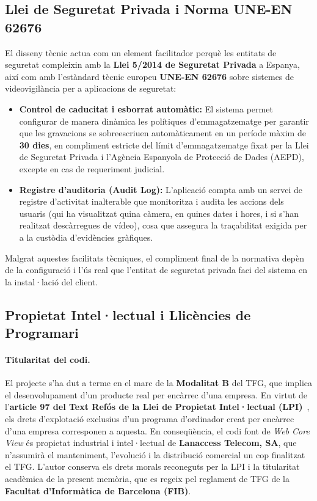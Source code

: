 \subsection{Llei de Seguretat Privada i Norma UNE-EN 62676}
El disseny tècnic actua com un element facilitador perquè les entitats de seguretat compleixin amb la \textbf{Llei 5/2014 de Seguretat Privada} a Espanya, així com amb l'estàndard tècnic europeu \textbf{UNE-EN 62676} sobre sistemes de videovigilància per a aplicacions de seguretat:
\begin{itemize}
  \item \textbf{Control de caducitat i esborrat automàtic:} El sistema permet configurar de manera dinàmica les polítiques d'emmagatzematge per garantir que les gravacions se sobreescriuen automàticament en un període màxim de \textbf{30 dies}, en compliment estricte del límit d'emmagatzematge fixat per la Llei de Seguretat Privada i l'Agència Espanyola de Protecció de Dades (AEPD), excepte en cas de requeriment judicial.
  \item \textbf{Registre d'auditoria (Audit Log):} L'aplicació compta amb un servei de registre d'activitat inalterable que monitoritza i audita les accions dels usuaris (qui ha visualitzat quina càmera, en quines dates i hores, i si s'han realitzat descàrregues de vídeo), cosa que assegura la traçabilitat exigida per a la custòdia d'evidències gràfiques.
\end{itemize}
Malgrat aquestes facilitats tècniques, el compliment final de la normativa depèn de la configuració i l'ús real que l'entitat de seguretat privada faci del sistema en la instal·lació del client.

\subsection{Propietat Intel·lectual i Llicències de Programari}

\paragraph{Titularitat del codi.}
El projecte s'ha dut a terme en el marc de la \textbf{Modalitat B} del TFG, que implica el desenvolupament d'un producte real per encàrrec d'una empresa. En virtut de l'\textbf{article 97 del Text Refós de la Llei de Propietat Intel·lectual (LPI)}~\cite{lpi_spain}, els drets d'explotació exclusius d'un programa d'ordinador creat per encàrrec d'una empresa corresponen a aquesta. En conseqüència, el codi font de \textit{Web Core View} és propietat industrial i intel·lectual de \textbf{Lanaccess Telecom, SA}, que n'assumirà el manteniment, l'evolució i la distribució comercial un cop finalitzat el TFG. L'autor conserva els drets morals reconeguts per la LPI i la titularitat acadèmica de la present memòria, que es regeix pel reglament de TFG de la \textbf{Facultat d'Informàtica de Barcelona (FIB)}.

